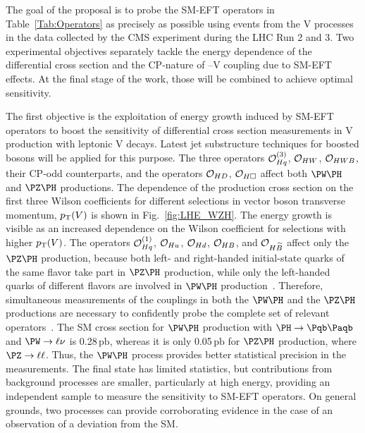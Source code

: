 \documentclass[a4paper,11pt]{article}
\newcommand{\Pb}{{{\Pqb}}\xspace}
\newcommand{\PAb}{{{{\Paqb}}}\xspace}
\renewcommand{\PV}{{{{V}}}\xspace}
\newcommand{\VH}{{{\PV}{\PH}}\xspace}
\newcommand{\pb} {\mbox{\ensuremath{\,\text{pb}}}\xspace}
\begin{document}
The goal of the proposal is to probe the SM-EFT operators in Table~\ref{Tab:Operators} as precisely as possible using events from the \VH processes in the data collected by the CMS experiment during the LHC Run 2 and 3. 
Two experimental objectives separately tackle the energy dependence of the differential cross section and the CP-nature of \PH--\PV coupling due to SM-EFT effects.
At the final stage of the work, those will be combined to achieve optimal sensitivity.

The first objective is the exploitation of energy growth
induced by SM-EFT operators
to boost the sensitivity of differential cross section measurements in \VH production with leptonic \PV decays.
Latest jet substructure techniques for boosted \PH bosons will be applied for this purpose.
The three operators ${\cal O}^{(3)}_{Hq}$, ${\cal O}_{HW}$, ${\cal O}_{HWB}$, their CP-odd counterparts, and the operators ${\cal O}_{HD}$, ${\cal O}_{H\square}$ affect both $\PW\PH$ and $\PZ\PH$ productions. 
The dependence of the production cross section on the first three Wilson coefficients for different selections in vector boson transverse momentum, $\pt(\PV)$ is shown in Fig.~\ref{fig:LHE_WZH}. 
The energy growth is visible as an increased dependence on the Wilson coefficient for selections with higher $\pt(\PV)$. 
The operators ${\cal O}^{(1)}_{Hq}$, ${\cal O}_{Hu}$, ${\cal O}_{Hd}$, ${\cal O}_{HB}$, and ${\cal O}_{H\widetilde{B}}$ affect only the $\PZ\PH$ production, 
because both left- and right-handed initial-state quarks of the same flavor take part in $\PZ\PH$ production, while only the left-handed quarks of different flavors are involved in $\PW\PH$ production~\cite{Falkowski:2014tna,Banerjee:2018bio}. 
Therefore, simultaneous measurements of the couplings in both the $\PW\PH$ and the $\PZ\PH$ productions are necessary to confidently probe the complete set of relevant operators~\cite{Banerjee:2019twi}.
The SM cross section for $\PW\PH$ production with  $\PH\rightarrow\Pb\PAb$ and $\PW\rightarrow\ell\nu$  is 0.28\pb, whereas it is only 0.05\pb for $\PZ\PH$ production, where $\PZ\rightarrow\ell\ell$.
Thus, the $\PW\PH$ process provides better statistical precision in the measurements. 
The \PZ final state has limited statistics, 
but contributions from background processes are smaller, 
particularly at high energy, 
providing an independent sample to measure the sensitivity to SM-EFT operators. 
On general grounds, 
two processes can provide corroborating evidence in the case of an observation of a deviation from the SM.
\end{document}
